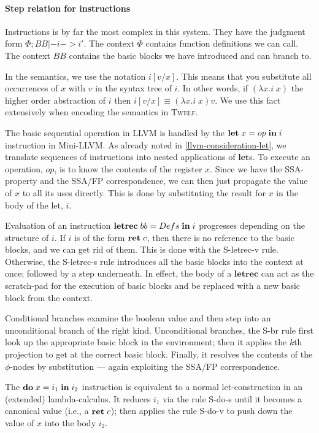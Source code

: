 \documentclass[a4paper, oneside, 10pt, draft]{memoir}
\newcommand{\twelf}{\textsc{Twelf}}
\begin{document}
\paragraph{Step relation for instructions}

Instructions is by far the most complex in this system. They have the
judgment form $\boxed{\Phi;BB |- i -> i'}$. The context $\Phi$
contains function definitions we can call. The context $BB$ contains
the basic blocks we have introduced and can branch to.

In the semantics, we use the notation $i[v/x]$. This means that you
substitute all occurrences of $x$ with $v$ in the syntax tree of
$i$. In other words, if $(\lambda x . i\; x)$ the higher order
abstraction of $i$ then $i[v/x] \equiv (\lambda x . i\; x) v$. We
use this fact extensively when encoding the semantics in \twelf{}.

The basic sequential operation in LLVM is handled by the
$\mathbf{let} \; x = op \; \mathbf{in} \; i$ instruction in Mini-LLVM. As already noted in
\ref{llvm-consideration-let}, we translate sequences of instructions
into nested applications of $\mathbf{let}$s. To execute an operation,
$op$, is to know the contents of the register $x$. Since we have the
SSA-property and the SSA/FP correspondence, we can then just propagate
the value of $x$ to all its uses directly. This is done by
substituting the result for $x$ in the body of the let, $i$.

Evaluation of an instruction $\mathbf{letrec} \; bb = Defs \; \mathbf{in} \; i$ progresses
depending on the structure of $i$. If $i$ is of the form $\mathbf{ret} \; c$,
then there is no reference to the basic blocks, and we can get rid of
them. This is done with the S-letrec-v rule. Otherwise, the S-letrec-s
rule introduces all the basic blocks into the context at once;
followed by a step underneath.  In effect, the body of a
$\mathbf{letrec}$ can act as the scratch-pad for the execution of
basic blocks and be replaced with a new basic block from the context.

Conditional branches examine the boolean value and then step into an
unconditional branch of the right kind. Unconditional branches, the
S-br rule first look up the appropriate basic block in the
environment; then it applies the $k$th projection to get at the
correct basic block. Finally, it resolves the contents of the
$\phi$-nodes by substitution --- again exploiting the SSA/FP
correspondence.

The $\mathbf{do} \; x = i_1 \; \mathbf{in} \; i_2$ instruction is equivalent to a normal
let-construction in an (extended) lambda-calculus. It reduces $i_1$ via the
rule S-do-s until it becomes a canonical value (i.e., a $\mathbf{ret} \; c$);
then applies the rule S-do-v to push down the value of $x$ into the
body $i_2$.
\end{document}
